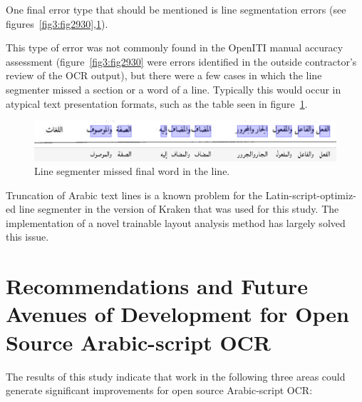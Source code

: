 One final error type that should be mentioned is line segmentation errors (see
figures~\ref{fig3:fig2930},\ref{fig3:fig31}). 

This type of error was not commonly found in the OpenITI manual accuracy
assessment (figure~\ref{fig3:fig2930} were errors identified in the outside contractor’s
review of the OCR output), but there were a few cases in which the line
segmenter missed a section or a word of a line. Typically this would occur in
atypical text presentation formats, such as the table seen in figure~\ref{fig3:fig31}.

\begin{figure}[h]
	\centering
	\includegraphics[width=\linewidth]{images/image4.png}
	\caption{Line segmenter missed final word in the line.}
	\label{fig3:fig31}
\end{figure} 

Truncation of Arabic text lines is a known problem for the
Latin-script-op\-tim\-iz-ed line segmenter in the version of Kraken that was used
for this study. The implementation of a novel trainable layout analysis method
has largely solved this issue\cite{kiessling2019badam}.

\section{Recommendations and Future Avenues of Development for Open Source Arabic-script OCR}

The results of this study indicate that work in the following three areas could
generate significant improvements for open source Arabic-script OCR: 


